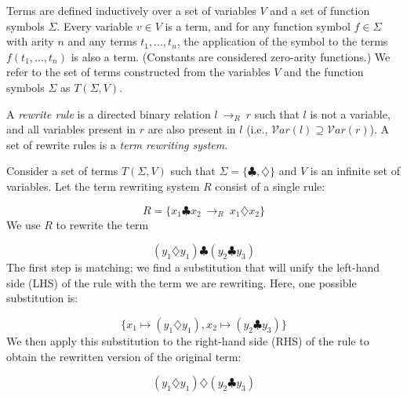 \documentclass[acmsmall,review,anonymous]{acmart}\settopmatter{printfolios=true,printccs=false,printacmref=false}
\newcommand{\rewrites}[0]{\:\rightarrow_{R}\:}
\begin{document}
Terms are defined inductively over a set of variables $V$ and a set of function symbols $\Sigma$. Every variable $v \in V$ is a term, and for any function symbol $f \in \Sigma$ with arity $n$ and any terms $t_1, ..., t_n$, the application of the symbol to the terms $f(t_1, ..., t_n)$ is also a term. (Constants are considered zero-arity functions.) We refer to the set of terms constructed from the variables $V$ and the function symbols $\Sigma$ as $T(\Sigma, V)$.

A \emph{rewrite rule} is a directed binary relation $l \rewrites r$ such that $l$ is not a variable, and all variables present in $r$ are also present in $l$ (i.e., $\mathcal{V}ar(l) \supseteq \mathcal{V}ar(r)$). A set of rewrite rules is a \emph{term rewriting system}.

Consider a set of terms $T(\Sigma, V)$ such that $\Sigma = \{\clubsuit, \diamondsuit\}$ and $V$ is an infinite set of variables. Let the term rewriting system $R$ consist of a single rule:

\[ R = \{ x_1 \clubsuit x_2 \rewrites x_1 \diamondsuit x_2 \} \]
We use $R$ to rewrite the term

\[ 
(y_1 \diamondsuit y_1) \clubsuit (y_2 \clubsuit y_3)
\]
The first step is matching; we find a substitution that will unify the left-hand side (LHS) of the rule with the term we are rewriting. Here, one possible substitution is:

\[
\{ x_1 \mapsto (y_1 \diamondsuit y_1), x_2 \mapsto (y_2 \clubsuit y_3) \}
\]
We then apply this substitution to the right-hand side (RHS) of the rule to obtain the rewritten version of the original term:

\[ 
(y_1 \diamondsuit y_1) \diamondsuit (y_2 \clubsuit y_3)
\]
\end{document}
